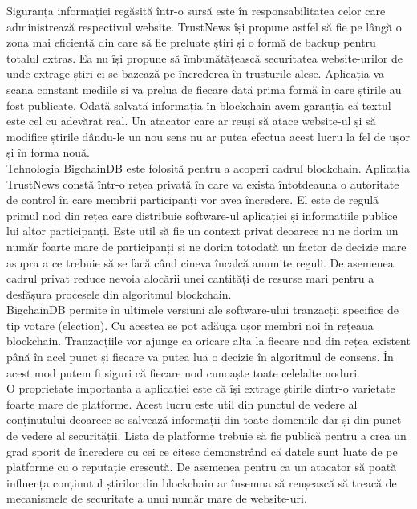 Siguranța informației regăsită într-o sursă este în responsabilitatea celor care administrează respectivul website. TrustNews își propune astfel să fie pe lângă o zona mai eficientă din care să fie preluate știri și o formă de backup pentru totalul extras. Ea nu își propune să îmbunătățească securitatea website-urilor de unde extrage știri ci se bazează pe încrederea în trusturile alese.
Aplicația va scana constant mediile și va prelua de fiecare dată prima formă în care știrile au fost publicate. Odată salvată informația în blockchain avem garanția că textul este cel cu adevărat real. Un atacator care ar reuși să atace website-ul și să modifice știrile dându-le un nou sens nu ar putea efectua acest lucru la fel de ușor și în forma nouă.\\

Tehnologia BigchainDB este folosită pentru a acoperi cadrul blockchain. Aplicația TrustNews constă într-o rețea privată în care va exista întotdeauna o autoritate de control în care membrii participanți vor avea încredere. El este de regulă primul nod din rețea care distribuie software-ul aplicației și informațiile publice lui altor participanți. Este util să fie un context privat deoarece nu ne dorim un număr foarte mare de participanți și ne dorim totodată un factor de decizie mare asupra a ce trebuie să se facă când cineva încalcă anumite reguli. De asemenea cadrul privat reduce nevoia alocării unei cantități de resurse mari pentru a desfășura procesele din algoritmul blockchain.\\

BigchainDB permite în ultimele versiuni ale software-ului tranzacții specifice de tip votare (election). Cu acestea se pot adăuga ușor membri noi în rețeaua blockchain. Tranzacțiile vor ajunge ca oricare alta la fiecare nod din rețea existent până în acel punct și fiecare va putea lua o decizie în algoritmul de consens. În acest mod putem fi siguri că fiecare nod cunoaște toate celelalte noduri.\\

O proprietate importanta a aplicației este că își extrage știrile dintr-o varietate foarte mare de platforme. Acest lucru este util din punctul de vedere al conținutului deoarece se salvează informații din toate domeniile dar și din punct de vedere al securității. Lista de platforme trebuie să fie publică pentru a crea un grad sporit de încredere cu cei ce citesc demonstrând că datele sunt luate de pe platforme cu o reputație crescută. De asemenea pentru ca un atacator să poată influența conținutul știrilor din blockchain ar însemna să reușească să treacă de mecanismele de securitate a unui număr mare de website-uri.\\

